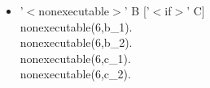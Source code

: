 \documentclass[10pt,a4paper]{article}
\begin{document}
\begin{itemize}
\item '$<$nonexecutable$>$' B ['$<$if$>$' C]\\
	nonexecutable(6,b\_1).\\
	nonexecutable(6,b\_2).\\
	nonexecutable(6,c\_1).\\
	nonexecutable(6,c\_2).
\end{itemize}
    
\end{document}

